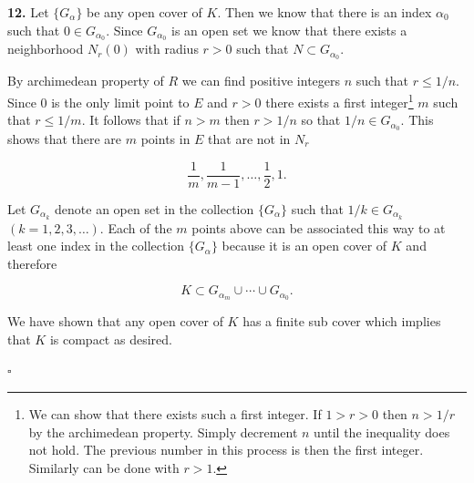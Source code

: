\documentclass[11pt]{article}
\author{Hesam Pakdaman}
\date{\today}
\title{}
\newcommand{\collection}[2]{\{{#1}_{#2}\}}
\begin{document}
\noindent\textbf{12.} Let $\collection{G}{\alpha}$ be any open cover
of $K$. Then we know that there is an index $\alpha_0$ such that
$0 \in G_{\alpha_0}$. Since $G_{\alpha_0}$ is an open set we know that
there exists a neighborhood $N_r(0)$ with radius $r > 0$ such that
$N \subset G_{\alpha_0}$.

By archimedean property of $R$ we can find positive integers $n$ such
that $r \leq 1/n$. Since $0$ is the only limit point to $E$ and
$r > 0$ there exists a first integer\footnote{We can show that there
  exists such a first integer. If $1 > r > 0$ then $n > 1/r$ by the
  archimedean property. Simply decrement $n$ until the inequality does
  not hold. The previous number in this process is then the first
  integer. Similarly can be done with $r>1$.} $m$ such that
$r \leq 1/m$. It follows that if $n > m$ then $r > 1/n$ so that
$1/n \in G_{\alpha_0}$. This shows that there are $m$ points in $E$
that are not in $N_r$


$$\frac{1}{m}, \frac{1}{m-1}, \dots, \frac{1}{2}, 1.$$


\noindent Let $G_{\alpha_k}$ denote an open set in the collection
$\collection{G}{\alpha}$ such that $1/k \in G_{\alpha_k}$
$(k = 1, 2, 3, \dots)$.  Each of the $m$ points above can be
associated this way to at least one index in the collection
$\collection{G}{\alpha}$ because it is an open cover of $K$ and
therefore


$$ K \subset G_{\alpha_m} \cup \cdots \cup G_{\alpha_0}.$$


\noindent We have shown that any open cover of $K$ has a finite sub cover which
implies that $K$ is compact as desired.

\hfill$\square$
\end{document}
